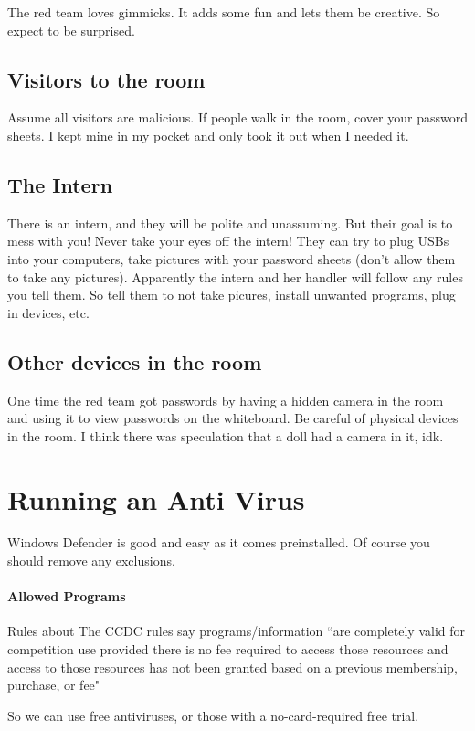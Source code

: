 \documentclass{article}
\begin{document}
The red team loves gimmicks. It adds some fun and lets them be creative. So expect to be surprised.

\subsection{Visitors to the room}
Assume all visitors are malicious.
If people walk in the room, cover your password sheets. I kept mine in my pocket and only took it out when I needed it. 

\subsection{The Intern}
There is an intern, and they will be polite and unassuming. But their goal is to mess with you! Never take your eyes off the intern!
They can try to plug USBs into your computers, take pictures with your password sheets (don't allow them to take any pictures).
Apparently the intern and her handler will follow any rules you tell them. So tell them to not take picures, install unwanted programs, plug in devices, etc.

\subsection{Other devices in the room}
One time the red team got passwords by having a hidden camera in the room and using it to view passwords on the whiteboard. 
Be careful of physical devices in the room. I think there was speculation that a doll had a camera in it, idk.

\section{Running an Anti Virus}
Windows Defender is good and easy as it comes preinstalled. Of course you should remove any exclusions.

\paragraph{Allowed Programs} Rules about The CCDC rules say programs/information ``are completely valid for competition use provided there is no 
fee required to access those resources and access to 
those resources has not been granted based on a previous membership, purchase, or fee"

\noindent So we can use free antiviruses, or those with a no-card-required free trial.
\end{document}
